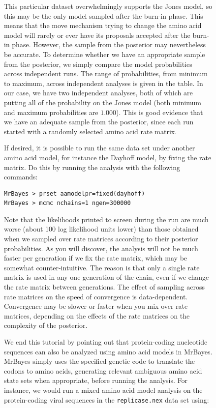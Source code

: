 \documentclass[12pt]{book}
\newcommand{\ttt}[1]{\texttt{#1}}
\begin{document}
\begin{figure}[h]
This particular dataset overwhelmingly supports the Jones model, so this may be the only model
sampled after the burn-in phase. This means that the move mechanism trying to change the amino acid
model will rarely or ever have its proposals accepted after the burn-in phase. However, the sample
from the posterior may nevertheless be accurate. To determine whether we have an appropriate sample
from the posterior, we simply compare the model probabilities across independent runs. The range of
probabilities, from minimum to maximum, across independent analyses is given in the table. In our
case, we have two independent analyses, both of which are putting all of the probability on the
Jones model (both minimum and maximum probabilities are $1.000$). This is good evidence that we
have an adequate sample from the posterior, since each run started with a randomly selected amino
acid rate matrix.

If desired, it is possible to run the same data set under another amino acid model, for instance
the Dayhoff model, by fixing the rate matrix. Do this by running the analysis with the following
commands:

\begin{singlespacing}
\small
\begin{verbatim}
MrBayes > prset aamodelpr=fixed(dayhoff)
MrBayes > mcmc nchains=1 ngen=300000
\end{verbatim}
\normalsize
\end{singlespacing}

Note that the likelihoods printed to screen during the run are much worse (about 100 log likelihood
units lower) than those obtained when we sampled over rate matrices according to their posterior
probabilities. As you will discover, the analysis will not be much faster per generation if we fix
the rate matrix, which may be somewhat counter-intuitive. The reason is that only a single rate
matrix is used in any one generation of the chain, even if we change the rate matrix between
generations. The effect of sampling across rate matrices on the speed of convergence is
data-dependent. Convergence may be slower or faster when you mix over rate matrices, depending on
the effects of the rate matrices on the complexity of the posterior.

We end this tutorial by pointing out that protein-coding nucleotide sequences can also be analyzed
using amino acid models in MrBayes. MrBayes simply uses the specified genetic code to translate the
codons to amino acids, generating relevant ambiguous amino acid state sets when appropriate, before
running the analysis. For instance, we would run a mixed amino acid model analysis on the
protein-coding viral sequences in the \ttt{replicase.nex} data set using:


\end{figure}
\end{document}
